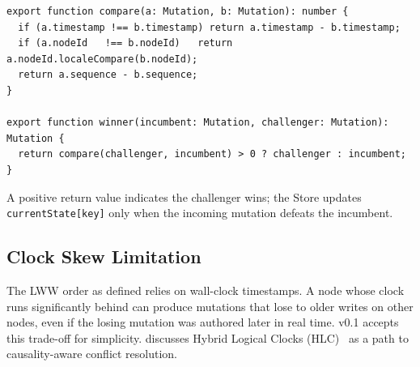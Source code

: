 \begin{lstlisting}[caption={LWW comparison function (TypeScript).}]
export function compare(a: Mutation, b: Mutation): number {
  if (a.timestamp !== b.timestamp) return a.timestamp - b.timestamp;
  if (a.nodeId   !== b.nodeId)   return a.nodeId.localeCompare(b.nodeId);
  return a.sequence - b.sequence;
}

export function winner(incumbent: Mutation, challenger: Mutation): Mutation {
  return compare(challenger, incumbent) > 0 ? challenger : incumbent;
}
\end{lstlisting}

A positive return value indicates the challenger wins; the Store updates
\texttt{currentState[key]} only when the incoming mutation defeats the incumbent.

\subsection{Clock Skew Limitation}

The LWW order as defined relies on wall-clock timestamps. A node whose clock
runs significantly behind can produce mutations that lose to older writes on
other nodes, even if the losing mutation was authored later in real time.
\pebble{} v0.1 accepts this trade-off for simplicity. 
discusses Hybrid Logical Clocks (HLC)~\cite{kulkarni2014hlc} as a path to
causality-aware conflict resolution.
